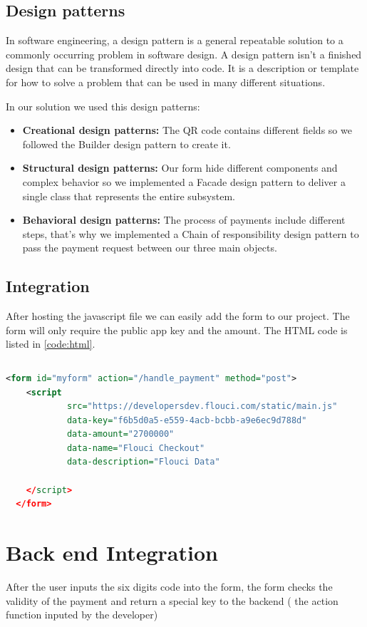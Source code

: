 \begin{spacing}{1.2}
\subsection{Design patterns}
In software engineering, a design pattern\cite{designpattern} is a general repeatable solution to a commonly occurring problem in software design. A design pattern isn't a finished design that can be transformed directly into code. It is a description or template for how to solve a problem that can be used in many different situations.

In our solution we used this design patterns:
\begin{itemize}
	\item \textbf{Creational design patterns\cite{designpattern}:} The QR code contains different fields so we followed the Builder design pattern to create it.
	\item \textbf{Structural design patterns\cite{designpattern}:} Our form hide different components and complex behavior so we implemented a Facade design pattern to deliver a single class that 
	 represents the entire subsystem.
	 \item \textbf{Behavioral design patterns\cite{designpattern}:} The process of payments include different steps, that's why we implemented a  Chain of responsibility design pattern to pass the payment request between our three main objects.
\end{itemize}
\subsection{Integration}
After hosting the javascript file we can easily add the form to our project. The form will only require the public app key  and the amount.
The HTML code is listed in \ref{code:html}.
\begin{lstlisting}[rulecolor=\color{white}]
\end{lstlisting}
\begin{lstlisting}[label=code:html,caption=Flouci Integration Java,language=xml]
 <form id="myform" action="/handle_payment" method="post">
    <script
            src="https://developersdev.flouci.com/static/main.js"
            data-key="f6b5d0a5-e559-4acb-bcbb-a9e6ec9d788d"
            data-amount="2700000"
            data-name="Flouci Checkout"
            data-description="Flouci Data"

    </script>
  </form>
\end{lstlisting}


\section{Back end Integration}
After the user inputs the six digits code into the form, the form checks the validity of the payment and return a special key to the backend ( the action function inputed by the developer)


\end{spacing}
